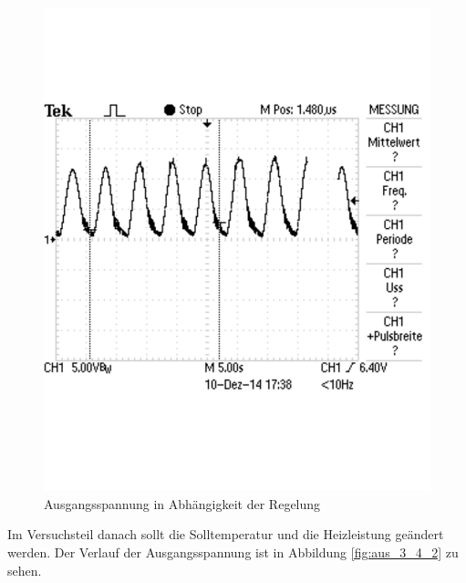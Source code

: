 \documentclass[12pt,a4paper]{article}
\begin{document}
\begin{figure}[H] 
  \centering
    \includegraphics[trim = 0mm 50mm 0mm 50mm, clip, scale = 0.6]{TEK0007.pdf}
  	\caption[Ausgangsspannung in Abhängigkeit der Regelung]{Ausgangsspannung in Abhängigkeit der Regelung}
  \label{fig:aus_3_4_1}
\end{figure}

Im Versuchsteil danach sollt die Solltemperatur und die Heizleistung geändert werden. Der Verlauf der Ausgangsspannung ist in Abbildung \ref{fig:aus_3_4_2} zu sehen.
\end{document}
